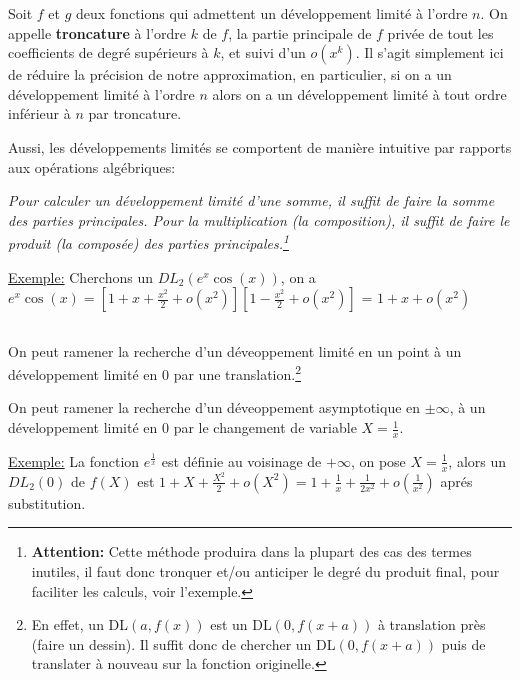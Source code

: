 Soit \(f\) et \(g\) deux fonctions qui admettent un développement limité à l'ordre \(n\).\+
On appelle \textbf{troncature} à l'ordre \(k\) de \(f\), la partie principale de \(f\) privée de tout les coefficients de degré supérieurs à \(k\), et suivi d'un \(o(x^k)\). Il s'agit simplement ici de réduire la précision de notre approximation, en particulier, si on a un développement limité à l'ordre \(n\) alors on a un développement limité à tout ordre inférieur à \(n\) par troncature.\<

Aussi, les développements limités se comportent de manière intuitive par rapports aux opérations algébriques:
\begin{center}
   \textit{Pour calculer un développement limité d'une somme, il suffit de faire la somme des parties principales. \+
   Pour la multiplication (la composition), il suffit de faire le produit (la composée) des parties principales.\footnote[1]{\textbf{Attention:} Cette méthode produira dans la plupart des cas des termes inutiles, il faut donc tronquer et/ou anticiper le degré du produit final, pour faciliter les calculs, voir l'exemple.} }
\end{center}

\underline{Exemple:} Cherchons un \(DL_2(e^x\cos(x))\), on a \(e^x\cos(x) = [1 + x + \frac{x^2}{2}+o(x^2)] [1 - \frac{x^2}{2} + o(x^2)]  \) = \(1 + x + o(x^2)\)

\subsection*{}

On peut ramener la recherche d'un déveoppement limité en un point à un développement limité en \(0\) par une translation.\footnote[2]{En effet, un DL\((a, f(x))\) est un DL\((0, f(x + a))\) à translation près (faire un dessin). Il suffit donc de chercher un DL\((0, f(x + a))\) puis de translater à nouveau sur la fonction originelle.}\<

On peut ramener la recherche d'un déveoppement asymptotique en \(\pm \infty\), à un développement limité en \(0\) par le changement de variable
\( X = \frac{1}{x}\).\<

\underline{Exemple:} La fonction \(e^\frac{1}{x}\) est définie au voisinage de \(+ \infty\), on pose \(X = \frac{1}{x}\), alors un \(DL_2(0)\) de \(f(X)\) est \(1 + X + \frac{X^2}{2}+o(X^2) = 1 + \frac{1}{x} + \frac{1}{2x^2} + o(\frac{1}{x^2})\) aprés substitution.
\pagebreak

